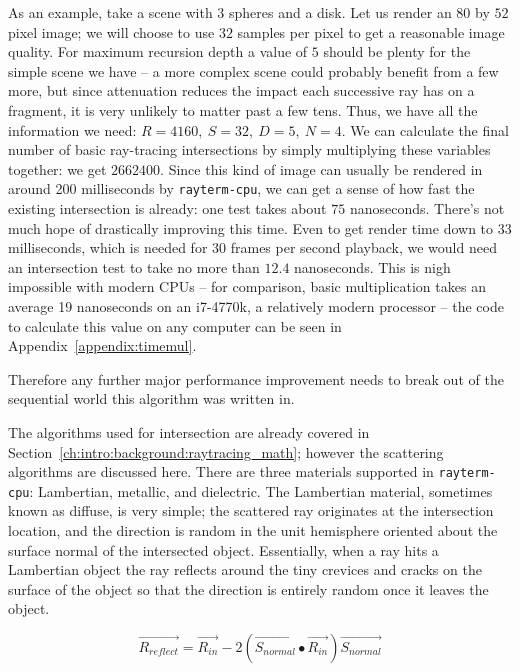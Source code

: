 As an example, take a scene with $3$ spheres and a disk.
Let us render an $80$ by $52$ pixel image;
we will choose to use $32$ samples per pixel to get a reasonable image quality.
For maximum recursion depth a value of $5$ should be plenty for the simple scene we have -- a more complex scene could probably benefit from a few more, but since attenuation reduces the impact each successive ray has on a fragment, it is very unlikely to matter past a few tens.
Thus, we have all the information we need: $R = 4160,\ S = 32,\ D = 5,\ N = 4$.
We can calculate the final number of basic ray-tracing intersections by simply multiplying these variables together: we get $2662400$.
Since this kind of image can usually be rendered in around 200 milliseconds by \texttt{rayterm-cpu}, we can get a sense of how fast the existing intersection is already: one test takes about $75$ nanoseconds.
There's not much hope of drastically improving this time.
Even to get render time down to $33$ milliseconds, which is needed for $30$ frames per second playback, we would need an intersection test to take no more than $12.4$ nanoseconds.
This is nigh impossible with modern CPUs -- for comparison, basic multiplication takes an average 19 nanoseconds on an i7-4770k, a relatively modern processor -- the code to calculate this value on any computer can be seen in Appendix~\ref{appendix:timemul}.

Therefore any further major performance improvement needs to break out of the sequential world this algorithm was written in.

The algorithms used for intersection are already covered in Section~\ref{ch:intro:background:raytracing_math}; however the scattering algorithms are discussed here.
There are three materials supported in \texttt{rayterm-cpu}: Lambertian, metallic, and dielectric.
The Lambertian material, sometimes known as diffuse, is very simple; the scattered ray originates at the intersection location, and the direction is random in the unit hemisphere oriented about the surface normal of the intersected object.
Essentially, when a ray hits a Lambertian object the ray reflects around the tiny crevices and cracks on the surface of the object so that the direction is entirely random once it leaves the object.

\begin{equation}
  \label{equation:reflection}
  \vec{R_{reflect}} = \vec{R_{in}} - 2(\vec{S_{normal}} \bullet \vec{R_{in}})\vec{S_{normal}}
\end{equation}

